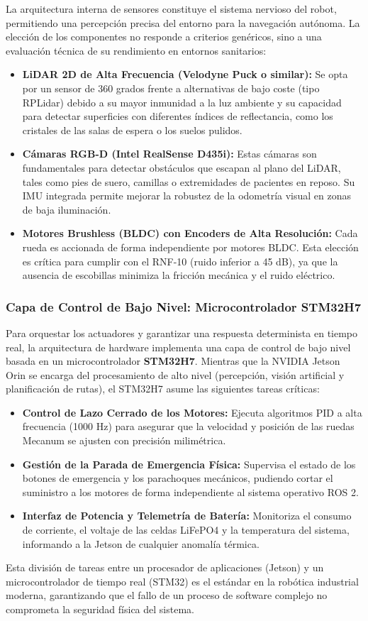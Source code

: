 La arquitectura interna de sensores constituye el sistema nervioso del robot, permitiendo una percepción precisa del entorno para la navegación autónoma. La elección de los componentes no responde a criterios genéricos, sino a una evaluación técnica de su rendimiento en entornos sanitarios:
\begin{itemize}
    \item \textbf{LiDAR 2D de Alta Frecuencia (Velodyne Puck o similar):} Se opta por un sensor de 360 grados frente a alternativas de bajo coste (tipo RPLidar) debido a su mayor inmunidad a la luz ambiente y su capacidad para detectar superficies con diferentes índices de reflectancia, como los cristales de las salas de espera o los suelos pulidos.
    \item \textbf{Cámaras RGB-D (Intel RealSense D435i):} Estas cámaras son fundamentales para detectar obstáculos que escapan al plano del LiDAR, tales como pies de suero, camillas o extremidades de pacientes en reposo. Su IMU integrada permite mejorar la robustez de la odometría visual en zonas de baja iluminación.
    \item \textbf{Motores Brushless (BLDC) con Encoders de Alta Resolución:} Cada rueda es accionada de forma independiente por motores BLDC. Esta elección es crítica para cumplir con el RNF-10 (ruido inferior a 45 dB), ya que la ausencia de escobillas minimiza la fricción mecánica y el ruido eléctrico.
\end{itemize}

\subsubsection{Capa de Control de Bajo Nivel: Microcontrolador STM32H7}
Para orquestar los actuadores y garantizar una respuesta determinista en tiempo real, la arquitectura de hardware implementa una capa de control de bajo nivel basada en un microcontrolador \textbf{STM32H7}. Mientras que la NVIDIA Jetson Orin se encarga del procesamiento de alto nivel (percepción, visión artificial y planificación de rutas), el STM32H7 asume las siguientes tareas críticas:
\begin{itemize}
    \item \textbf{Control de Lazo Cerrado de los Motores:} Ejecuta algoritmos PID a alta frecuencia (1000 Hz) para asegurar que la velocidad y posición de las ruedas Mecanum se ajusten con precisión milimétrica.
    \item \textbf{Gestión de la Parada de Emergencia Física:} Supervisa el estado de los botones de emergencia y los parachoques mecánicos, pudiendo cortar el suministro a los motores de forma independiente al sistema operativo ROS 2.
    \item \textbf{Interfaz de Potencia y Telemetría de Batería:} Monitoriza el consumo de corriente, el voltaje de las celdas LiFePO4 y la temperatura del sistema, informando a la Jetson de cualquier anomalía térmica.
\end{itemize}
Esta división de tareas entre un procesador de aplicaciones (Jetson) y un microcontrolador de tiempo real (STM32) es el estándar en la robótica industrial moderna, garantizando que el fallo de un proceso de software complejo no comprometa la seguridad física del sistema.

